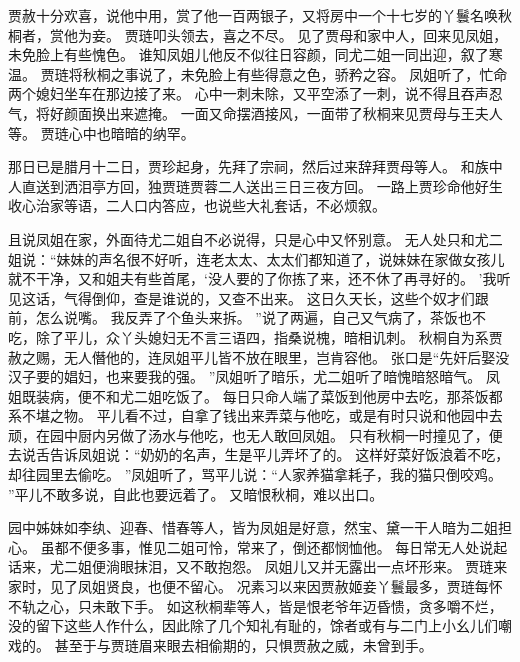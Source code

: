 贾赦十分欢喜，说他中用，赏了他一百两银子，又将房中一个十七岁的丫鬟名唤秋桐者，赏他为妾。
贾琏叩头领去，喜之不尽。
见了贾母和家中人，回来见凤姐，未免脸上有些愧色。
谁知凤姐儿他反不似往日容颜，同尤二姐一同出迎，叙了寒温。
贾琏将秋桐之事说了，未免脸上有些得意之色，骄矜之容。
凤姐听了，忙命两个媳妇坐车在那边接了来。
心中一刺未除，又平空添了一刺，说不得且吞声忍气，将好颜面换出来遮掩。
一面又命摆酒接风，一面带了秋桐来见贾母与王夫人等。
贾琏心中也暗暗的纳罕。
\par
那日已是腊月十二日，贾珍起身，先拜了宗祠，然后过来辞拜贾母等人。
和族中人直送到洒泪亭方回，独贾琏贾蓉二人送出三日三夜方回。
一路上贾珍命他好生收心治家等语，二人口内答应，也说些大礼套话，不必烦叙。
\par
且说凤姐在家，外面待尤二姐自不必说得，只是心中又怀别意。
无人处只和尤二姐说：“妹妹的声名很不好听，连老太太、太太们都知道了，说妹妹在家做女孩儿就不干净，又和姐夫有些首尾，‘没人要的了你拣了来，还不休了再寻好的。
’我听见这话，气得倒仰，查是谁说的，又查不出来。
这日久天长，这些个奴才们跟前，怎么说嘴。
我反弄了个鱼头来拆。
”说了两遍，自己又气病了，茶饭也不吃，除了平儿，众丫头媳妇无不言三语四，指桑说槐，暗相讥刺。
秋桐自为系贾赦之赐，无人僭他的，连凤姐平儿皆不放在眼里，岂肯容他。
张口是“先奸后娶没汉子要的娼妇，也来要我的强。
”凤姐听了暗乐，尤二姐听了暗愧暗怒暗气。
凤姐既装病，便不和尤二姐吃饭了。
每日只命人端了菜饭到他房中去吃，那茶饭都系不堪之物。
平儿看不过，自拿了钱出来弄菜与他吃，或是有时只说和他园中去顽，在园中厨内另做了汤水与他吃，也无人敢回凤姐。
只有秋桐一时撞见了，便去说舌告诉凤姐说：“奶奶的名声，生是平儿弄坏了的。
这样好菜好饭浪着不吃，却往园里去偷吃。
”凤姐听了，骂平儿说：“人家养猫拿耗子，我的猫只倒咬鸡。
”平儿不敢多说，自此也要远着了。
又暗恨秋桐，难以出口。
\par
园中姊妹如李纨、迎春、惜春等人，皆为凤姐是好意，然宝、黛一干人暗为二姐担心。
虽都不便多事，惟见二姐可怜，常来了，倒还都悯恤他。
每日常无人处说起话来，尤二姐便淌眼抹泪，又不敢抱怨。
凤姐儿又并无露出一点坏形来。
贾琏来家时，见了凤姐贤良，也便不留心。
况素习以来因贾赦姬妾丫鬟最多，贾琏每怀不轨之心，只未敢下手。
如这秋桐辈等人，皆是恨老爷年迈昏愦，贪多嚼不烂，没的留下这些人作什么，因此除了几个知礼有耻的，馀者或有与二门上小幺儿们嘲戏的。
甚至于与贾琏眉来眼去相偷期的，只惧贾赦之威，未曾到手。

